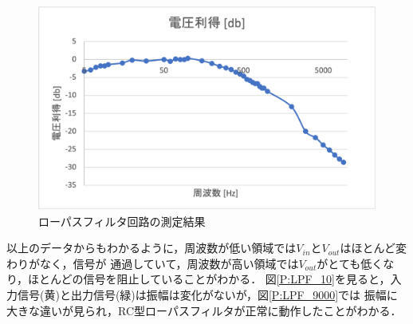 \documentclass[a4paper,11pt]{jsarticle}
\begin{document}
\begin{figure}[H]
  \centering
  \includegraphics[width=0.8\linewidth]{picture/G_LPF_db.png}
  \caption{ローパスフィルタ回路の測定結果}
  \label{G:LPF_result}
\end{figure}
以上のデータからもわかるように，周波数が低い領域では$V_{in}とV_{out}$はほとんど変わりがなく，信号が
通過していて，周波数が高い領域では$V_{out}$がとても低くなり，ほとんどの信号を阻止していることがわかる．
図\ref{P:LPF_10}を見ると，入力信号(黄)と出力信号(緑)は振幅は変化がないが，図\ref{P:LPF_9000}では
振幅に大きな違いが見られ，RC型ローパスフィルタが正常に動作したことがわかる．
\end{document}
